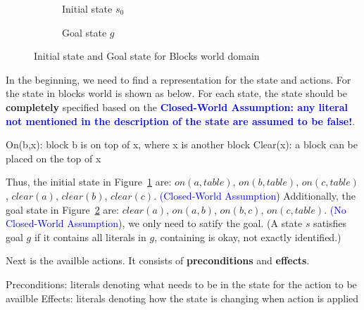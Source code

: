 \begin{figure}[htbp]
    \centering
    \begin{subfigure}[t]{0.25\textwidth}
        \centering
        \caption{Initial state $s_{0}$}
        \label{fig:initial_state_in_BWD}
    \end{subfigure}
    \begin{subfigure}[t]{0.25\textwidth}
        \centering
        \caption{Goal state $g$}
        \label{fig:goal_state_in_BWD}
    \end{subfigure}
    \caption{Initial state and Goal state for Blocks world domain}
    \label{fig:states_in_BWD}
\end{figure}

\noindent
In the beginning, we need to find a representation for the state and actions. For the state in blocks world is shown as below. For each state, the state should be \textbf{completely} specified based on the \textcolor{blue}{\textbf{Closed-World Assumption: any literal not mentioned in the description of the state are assumed to be false!}}.
\begin{outline}
    \1 On(b,x):
        \2 block b is on top of x, where x is another block 
    \1 Clear(x):
        \2 a block can be placed on the top of x
\end{outline}

\noindent
Thus, the initial state in Figure~\ref{fig:initial_state_in_BWD} are: $on(a,table)$, $on(b,table)$, $on(c,table)$, $clear(a)$, $clear(b)$, $clear(c)$. \textcolor{blue}{(Closed-World Assumption)} Additionally, the goal state in Figure~\ref{fig:goal_state_in_BWD} are: $clear(a)$, $on(a,b)$, $on(b,c)$, $on(c,table)$. \textcolor{blue}{(No Closed-World Assumption)}, we only need to satify the goal. (A state $s$ satisfies goal $g$ if it contains all literals in $g$, containing is okay, not exactly identified.)

\noindent
Next is the availble actions. It consists of \textbf{preconditions} and \textbf{effects}.
\begin{outline}
    \1 Preconditions: literals denoting what needs to be in the state for the action to be availble
    \1 Effects: literals denoting how the state is changing when action is applied
\end{outline}

